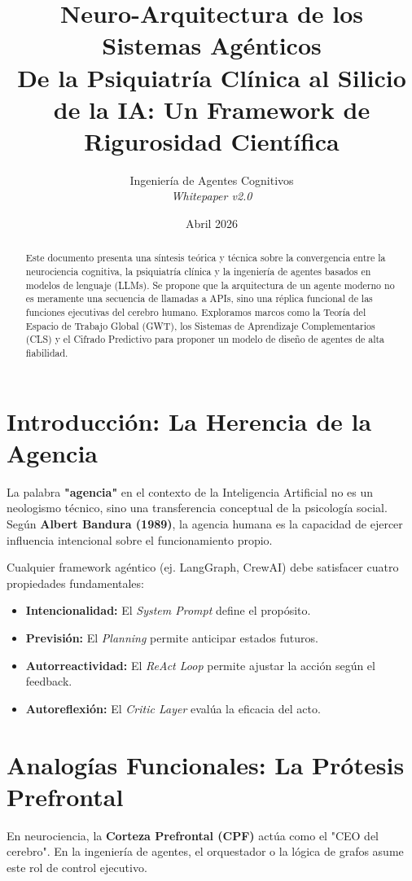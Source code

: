 \documentclass[11pt,a4paper,oneside]{article}
\title{\textbf{Neuro-Arquitectura de los Sistemas Agénticos}\\ \Large De la Psiquiatría Clínica al Silicio de la IA: Un Framework de Rigurosidad Científica}
\author{Ingeniería de Agentes Cognitivos \\ \textit{Whitepaper v2.0}}
\date{Abril 2026}
\begin{document}
\maketitle

\begin{abstract}
Este documento presenta una síntesis teórica y técnica sobre la convergencia entre la neurociencia cognitiva, la psiquiatría clínica y la ingeniería de agentes basados en modelos de lenguaje (LLMs). Se propone que la arquitectura de un agente moderno no es meramente una secuencia de llamadas a APIs, sino una réplica funcional de las funciones ejecutivas del cerebro humano. Exploramos marcos como la Teoría del Espacio de Trabajo Global (GWT), los Sistemas de Aprendizaje Complementarios (CLS) y el Cifrado Predictivo para proponer un modelo de diseño de agentes de alta fiabilidad.
\end{abstract}

\tableofcontents

\newpage

\section{Introducción: La Herencia de la Agencia}
La palabra \textbf{"agencia"} en el contexto de la Inteligencia Artificial no es un neologismo técnico, sino una transferencia conceptual de la psicología social. Según \textbf{Albert Bandura (1989)}, la agencia humana es la capacidad de ejercer influencia intencional sobre el funcionamiento propio.

\begin{tcolorbox}[colback=blue!5,colframe=blue!75,title=La Tétrada de Bandura en IA]
Cualquier framework agéntico (ej. LangGraph, CrewAI) debe satisfacer cuatro propiedades fundamentales:
\begin{itemize}
    \item \textbf{Intencionalidad:} El \textit{System Prompt} define el propósito.
    \item \textbf{Previsión:} El \textit{Planning} permite anticipar estados futuros.
    \item \textbf{Autorreactividad:} El \textit{ReAct Loop} permite ajustar la acción según el feedback.
    \item \textbf{Autoreflexión:} El \textit{Critic Layer} evalúa la eficacia del acto.
\end{itemize}
\end{tcolorbox}

\section{Analogías Funcionales: La Prótesis Prefrontal}
En neurociencia, la \textbf{Corteza Prefrontal (CPF)} actúa como el "CEO del cerebro". En la ingeniería de agentes, el orquestador o la lógica de grafos asume este rol de control ejecutivo.
\end{document}
